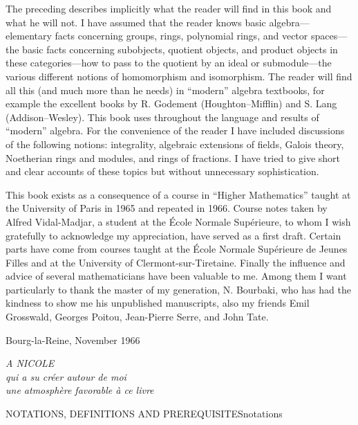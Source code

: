 The preceding describes implicitly what the reader will find in this book
and what he will not. I have assumed that the reader knows basic
algebra---elementary facts concerning groups, rings, polynomial rings, and
vector spaces---the basic facts concerning subobjects, quotient objects, and
product objects in these categories---how to pass to the quotient by an
ideal or submodule---the various different notions of homomorphism and
isomorphism. The reader will find all this (and much more than he needs) in
``modern'' algebra textbooks, for example the excellent books by
R. Godement (Houghton--Mifflin) and S. Lang (Addison--Wesley). This book
uses throughout the language and results of ``modern'' algebra. For the
convenience of the reader I have included discussions of the following
notions: integrality, algebraic extensions of fields, Galois theory,
Noetherian rings and modules, and rings of fractions. I have tried to give
short and clear accounts of these topics but without unnecessary
sophistication.

This book exists as a consequence of a course in ``Higher Mathematics''
taught at the University of Paris in 1965 and repeated in 1966. Course notes
taken by Alfred Vidal-Madjar, a student at the École Normale Supérieure, to
whom I wish gratefully to acknowledge my appreciation, have served as a
first draft. Certain parts have come from courses taught at the École
Normale Supérieure de Jeunes Filles and at the University of
Clermont-sur-Tiretaine. Finally the influence and advice of several
mathematicians have been valuable to me. Among them I want particularly to
thank the master of my generation, N. Bourbaki, who has had the kindness to
show me his unpublished manuscripts, also my friends Emil Grosswald,
Georges Poitou, Jean-Pierre Serre, and John Tate.

\vspace{1.2\baselineskip}
\begin{flushright}
Bourg-la-Reine, November 1966
\end{flushright}
\vspace{2.5\baselineskip}
\begin{flushright}\small\itshape
A NICOLE\\
qui a su créer autour de moi\\
une atmosphère favorable à ce livre
\end{flushright}

\clearpage
\setcounter{page}{11}%
%
       {NOTATIONS, DEFINITIONS AND PREREQUISITES}{notations}

